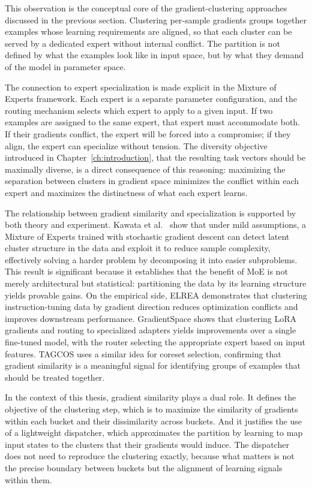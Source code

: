 This observation is the conceptual core of the gradient-clustering approaches discussed in the previous section. Clustering per-sample gradients groups together examples whose learning requirements are aligned, so that each cluster can be served by a dedicated expert without internal conflict. The partition is not defined by what the examples look like in input space, but by what they demand of the model in parameter space.

The connection to expert specialization is made explicit in the Mixture of Experts framework. Each expert is a separate parameter configuration, and the routing mechanism selects which expert to apply to a given input. If two examples are assigned to the same expert, that expert must accommodate both. If their gradients conflict, the expert will be forced into a compromise; if they align, the expert can specialize without tension. The diversity objective introduced in Chapter~\ref{ch:introduction}, that the resulting task vectors should be maximally diverse, is a direct consequence of this reasoning: maximizing the separation between clusters in gradient space minimizes the conflict within each expert and maximizes the distinctness of what each expert learns.

The relationship between gradient similarity and specialization is supported by both theory and experiment. Kawata et al.~\cite{kawata2025moe} show that under mild assumptions, a Mixture of Experts trained with stochastic gradient descent can detect latent cluster structure in the data and exploit it to reduce sample complexity, effectively solving a harder problem by decomposing it into easier subproblems. This result is significant because it establishes that the benefit of MoE is not merely architectural but statistical: partitioning the data by its learning structure yields provable gains. On the empirical side, ELREA demonstrates that clustering instruction-tuning data by gradient direction reduces optimization conflicts and improves downstream performance. GradientSpace shows that clustering LoRA gradients and routing to specialized adapters yields improvements over a single fine-tuned model, with the router selecting the appropriate expert based on input features. TAGCOS uses a similar idea for coreset selection, confirming that gradient similarity is a meaningful signal for identifying groups of examples that should be treated together.

In the context of this thesis, gradient similarity plays a dual role. It defines the objective of the clustering step, which is to maximize the similarity of gradients within each bucket and their dissimilarity across buckets. And it justifies the use of a lightweight dispatcher, which approximates the partition by learning to map input states to the clusters that their gradients would induce. The dispatcher does not need to reproduce the clustering exactly, because what matters is not the precise boundary between buckets but the alignment of learning signals within them.

